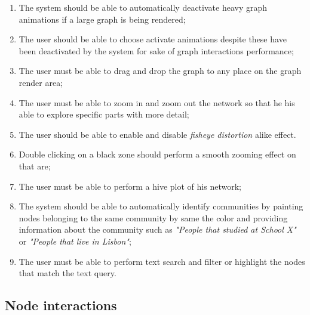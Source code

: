 \begin{enumerate}
    \item The system should be able to automatically deactivate heavy graph animations if a large graph is being rendered;
    \item The user should be able to choose activate animations despite these have been deactivated by the system for sake of graph interactions performance;
    \item The user must be able to drag and drop the graph to any place on the graph render area;
    \item The user must be able to zoom in and zoom out the network so that he his able to explore specific parts with more detail;
    \item The user should be able to enable and disable \textit{fisheye distortion} alike effect. %
    \item Double clicking on a black zone should perform a smooth zooming effect on that are; %
    \item The user must be able to perform a hive plot of his network;
    \item The system should be able to automatically identify communities by painting nodes belonging to the same community by same the color and providing
    information about the community such as \textit{"People that studied at School X"} or \textit{"People that live in Lisbon"};
    \item The user must be able to perform text search and filter or highlight the nodes that match the text query.
\end{enumerate}

\subsection{Node interactions}

